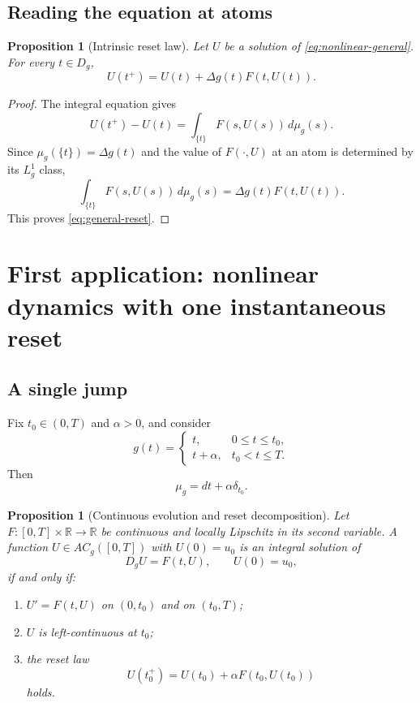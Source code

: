 \documentclass[preprint,12pt]{elsarticle}
\newcommand{\newrev}[1]{{\color{red}#1}}
\newcommand{\newrev}[1]{#1}
\newtheorem{proposition}[theorem]{Proposition}
\theoremstyle{definition}
\theoremstyle{remark}
\newcommand{\R}{\mathbb R}
\newcommand{\mug}{\mu_g}
\newcommand{\ACg}{AC_g}
\begin{document}
\subsection{Reading the equation at atoms}

\begin{proposition}[Intrinsic reset law]\label{prop:atomic-reset-general}
Let $U$ be a solution of \eqref{eq:nonlinear-general}. For every $t\in D_g$,
\begin{equation}\label{eq:general-reset}
 U(t^+)=U(t)+\Delta g(t)F(t,U(t)).
\end{equation}
\end{proposition}

\begin{proof}
The integral equation gives
\[
 U(t^+)-U(t)
 =\int_{\{t\}}F(s,U(s))\,d\mu_g(s).
\]
Since $\mu_g(\{t\})=\Delta g(t)$ and the value of $F(\cdot,U)$ at an atom is determined by its $L_g^1$ class,
\[
 \int_{\{t\}}F(s,U(s))\,d\mu_g(s)
 =\Delta g(t)F(t,U(t)).
\]
This proves \eqref{eq:general-reset}.
\end{proof}

\section{First application: nonlinear dynamics with one instantaneous reset}\label{sec:cubic}

\subsection{A single jump}

Fix $t_0\in(0,T)$ and $\alpha>0$, and consider
\begin{equation}\label{eq:g-one-jump}
 g(t)=
 \begin{cases}
 t,&0\le t\le t_0,\\
 t+\alpha,&t_0<t\le T.
 \end{cases}
\end{equation}
Then
\[
 \mug=dt+\alpha\delta_{t_0}.
\]

\begin{proposition}[Continuous evolution and reset decomposition]\label{prop:one-jump-decomposition}
Let $F:[0,T]\times\R\to\R$ be continuous and locally Lipschitz in its second variable. A function $U\in\ACg([0,T])$ \newrev{with $U(0)=u_0$} is an integral solution of
\begin{equation}\label{eq:one-jump-equation}
 D_gU=F(t,U),\qquad U(0)=u_0,
\end{equation}
if and only if:
\begin{enumerate}[label=\roman*)]
 \item $U'=F(t,U)$ on $(0,t_0)$ and on $(t_0,T)$;
 \item $U$ is left-continuous at $t_0$;
 \item the reset law
 \begin{equation}\label{eq:reset-general}
 U(t_0^+)=U(t_0)+\alpha F(t_0,U(t_0))
 \end{equation}
 holds.
\end{enumerate}
\end{proposition}
\end{document}

